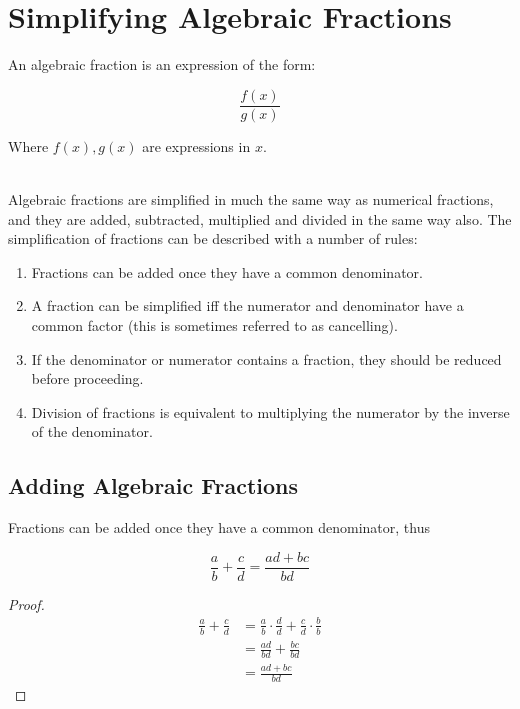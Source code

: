 \documentclass[english,course]{lecture}
\begin{document}
\section{Simplifying Algebraic Fractions}

\begin{definition}
	An algebraic fraction is an expression of the form:

	$$
		\frac{f(x)}{g(x)}
	$$

	Where $f(x), g(x)$ are expressions in $x$.
\end{definition}
\\
Algebraic fractions are simplified in much the same way as numerical fractions,
and they are added, subtracted, multiplied and divided in the same way also.
The simplification of fractions can be described with a number of rules:

\begin{enumerate}
	\item Fractions can be added once they have a common denominator.
	\item A fraction can be simplified iff the numerator and denominator have a common factor (this is sometimes referred to as cancelling).
	\item If the denominator or numerator contains a fraction, they should be reduced before proceeding.
	\item Division of fractions is equivalent to multiplying the numerator by the inverse of the denominator.
\end{enumerate}

\subsection{Adding Algebraic Fractions}

Fractions can be added once they have a common denominator, thus

\begin{theorem}
	$$
		\frac{a}{b} + \frac{c}{d} = \frac{ad + bc}{bd}
	$$
\end{theorem}

\begin{proof}
	\begin{align}
		\frac{a}{b} + \frac{c}{d}
		  & = \frac{a}{b} \cdot \frac{d}{d} + \frac{c}{d} \cdot \frac{b}{b} \label{multiplicive-identities} \\
		  & = \frac{ad}{bd} + \frac{bc}{bd}                                                                 \\
		  & = \frac{ad + bc}{bd}
	\end{align}
\end{proof}
\end{document}
